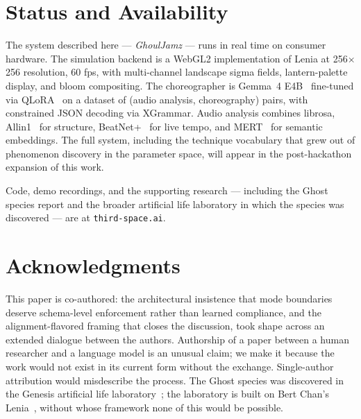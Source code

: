 \documentclass[11pt]{article}
\begin{document}
\section{Status and Availability}

The system described here --- \emph{GhoulJamz} --- runs in real time on
consumer hardware. The simulation backend is a WebGL2 implementation of
Lenia at 256$\times$256 resolution, 60 fps, with multi-channel landscape
sigma fields, lantern-palette display, and bloom compositing. The choreographer
is Gemma~4 E4B~\cite{gemma4} fine-tuned via QLoRA~\cite{lora,unsloth} on a
dataset of (audio analysis, choreography) pairs, with constrained JSON
decoding via XGrammar. Audio analysis combines librosa, Allin1~\cite{allin1}
for structure, BeatNet+~\cite{beatnet} for live tempo, and MERT~\cite{mert}
for semantic embeddings. The full system, including the technique vocabulary
that grew out of phenomenon discovery in the parameter space, will appear
in the post-hackathon expansion of this work.

Code, demo recordings, and the supporting research --- including the
Ghost species report and the broader artificial life laboratory in which
the species was discovered --- are at \texttt{third-space.ai}.

\section*{Acknowledgments}

This paper is co-authored: the architectural insistence that mode boundaries
deserve schema-level enforcement rather than learned compliance, and the
alignment-flavored framing that closes the discussion, took shape across an
extended dialogue between the authors. Authorship of a paper between a human
researcher and a language model is an unusual claim; we make it because the
work would not exist in its current form without the exchange. Single-author
attribution would misdescribe the process. The Ghost species was discovered
in the Genesis artificial life laboratory~\cite{genesis}; the laboratory is
built on Bert Chan's Lenia~\cite{chan2019lenia}, without whose framework
none of this would be possible.
\end{document}

